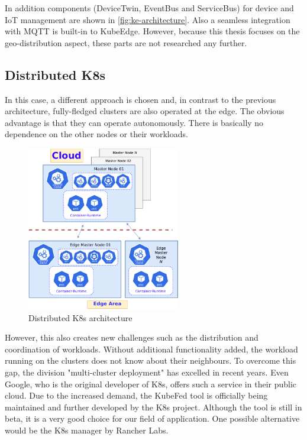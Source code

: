 \documentclass[MIC,Master,english]{twbook}%
\begin{document}
In addition components (DeviceTwin, EventBus and ServiceBus) for device and \ac{IoT} management are shown in \autoref{fig:ke-architecture}. Also a seamless integration with \ac{MQTT} is built-in to KubeEdge\cite{hal-kubeedge}. However, because this thesis focuses on the geo-distribution aspect, these parts are not researched any further.


\subsection{Distributed K8s}
\label{sec:disk8s}
In this case, a different approach is chosen and, in contrast to the previous architecture, fully-fledged clusters are also operated at the edge. The obvious advantage is that they can operate autonomously. There is basically no dependence on the other nodes or their workloads.

\begin{figure}[ht]
    \centering
    \includegraphics[width=0.60\textwidth]{PICs/drawio/distributed-k8s.drawio.pdf}
    \caption{Distributed \ac{K8s} architecture}
    \label{fig:distributed-k8s}
\end{figure}

However, this also creates new challenges such as the distribution and coordination of workloads. Without additional functionality added, the workload running on the clusters does not know about their neighbours. To overcome this gap, the division "multi-cluster deployment" has excelled in recent years. Even Google, who is the original developer of \ac{K8s}, offers such a service \cite{google-mcs} in their public cloud. Due to the increased demand, the \ac{KubeFed} tool is officially being maintained and further developed by the \ac{K8s} project\cite{kubefed-github}. Although the tool is still in beta, it is a very good choice for our field of application. One possible alternative would be the \ac{K8s} manager by Rancher Labs.
\end{document}
